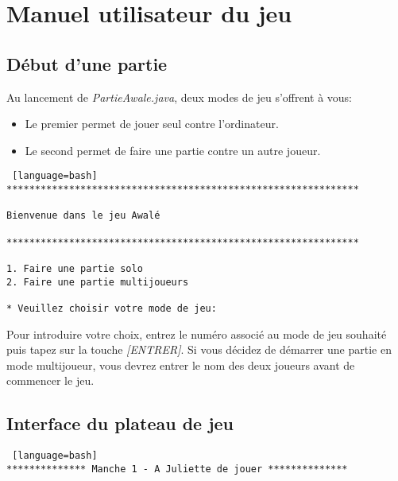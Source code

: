 \documentclass[11pt,a4paper]{report}
\begin{document}
    
    \endgroup

    \setlength{\parskip}{0pt}
    \chapter{Manuel utilisateur du jeu}
        \section{Début d'une partie}

            \begin{flushleft}
                Au lancement de \textit{PartieAwale.java}, deux modes de jeu s’offrent à vous:
                \begin{itemize}\renewcommand{\labelitemi}{$\bullet$}
                    \item Le premier permet de jouer seul contre l’ordinateur.
                    \item Le second permet de faire une partie contre un autre joueur.
                \end{itemize}
            \end{flushleft}

\begin{lstlisting} [language=bash]
**************************************************************

Bienvenue dans le jeu Awalé

**************************************************************

1. Faire une partie solo
2. Faire une partie multijoueurs

* Veuillez choisir votre mode de jeu:
\end{lstlisting}

            \begin{flushleft}
            Pour introduire votre choix, entrez le numéro associé au mode de jeu souhaité puis tapez sur la touche \textit{[ENTRER]}.\newline
            Si vous décidez de démarrer une partie en mode multijoueur, vous devrez entrer le nom des deux joueurs avant de commencer le jeu.
            \end{flushleft}            

        \section{Interface du plateau de jeu}

\begin{lstlisting} [language=bash]
************** Manche 1 - A Juliette de jouer **************
\end{lstlisting}
            
\end{document}
